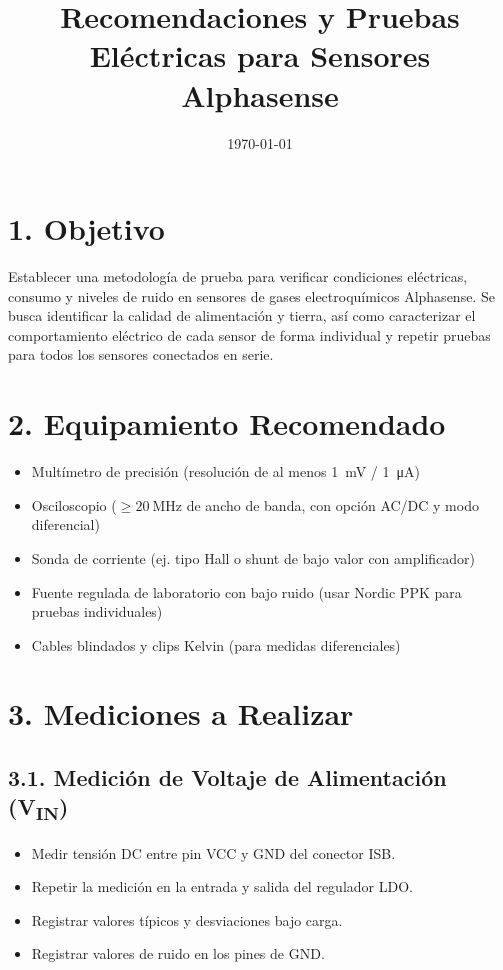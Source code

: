 \documentclass[12pt]{article}
\title{Recomendaciones y Pruebas Eléctricas para Sensores Alphasense}
\author{}
\date{\today}
\begin{document}
	
	\maketitle
	
	\section*{1. Objetivo}
	Establecer una metodología de prueba para verificar condiciones eléctricas, consumo y niveles de ruido en sensores de gases electroquímicos Alphasense. Se busca identificar la calidad de alimentación y tierra, así como caracterizar el comportamiento eléctrico de cada sensor de forma individual y repetir pruebas para todos los sensores conectados en serie.
	
	\section*{2. Equipamiento Recomendado}
	\begin{itemize}[label=\textbullet]
		\item Multímetro de precisión (resolución de al menos \SI{1}{\milli\volt} / \SI{1}{\micro\ampere})
		\item Osciloscopio (\(\geq \SI{20}{\mega\hertz}\) de ancho de banda, con opción AC/DC y modo diferencial)
		\item Sonda de corriente (ej. tipo Hall o shunt de bajo valor con amplificador)
		\item Fuente regulada de laboratorio con bajo ruido (usar Nordic PPK para pruebas individuales)
		\item Cables blindados y clips Kelvin (para medidas diferenciales)
	\end{itemize}
	
	\section*{3. Mediciones a Realizar}
	
	\subsection*{3.1. Medición de Voltaje de Alimentación (V\textsubscript{IN})}
	\begin{itemize}
		\item Medir tensión DC entre pin VCC y GND del conector ISB.
		\item Repetir la medición en la entrada y salida del regulador LDO.
		\item Registrar valores típicos y desviaciones bajo carga.
		\item Registrar valores de ruido en los pines de GND.
	\end{itemize}
	
\end{document}
